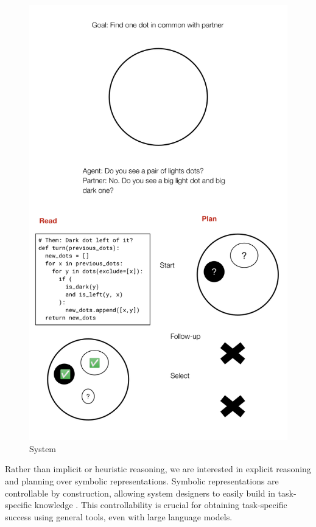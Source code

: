 \documentclass[11pt]{article}
\newcommand{\justin}[1]{{{\textcolor{purple}{(Justin: #1)}}}}
\begin{document}
\begin{figure}[t!]
\includegraphics[width=\columnwidth]{imgs/Read-plan col.png}
\caption{
\label{fig:system}
System
}
\end{figure}

Rather than implicit or heuristic reasoning, we are interested in explicit reasoning and planning over
symbolic representations.
Symbolic representations are controllable by construction,
allowing system designers to easily build in task-specific knowledge \citep{he2018dnd,cicero}.
This controllability is crucial for obtaining task-specific success using general tools,
even with large language models.
\end{document}
